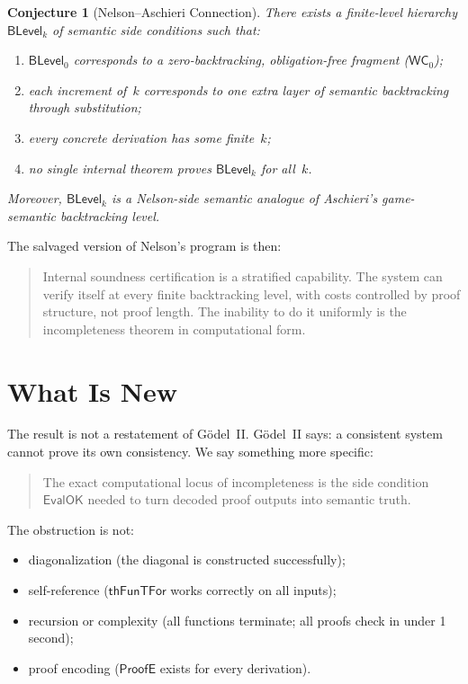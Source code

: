\documentclass[11pt]{article}
\newtheorem{conjecture}[theorem]{Conjecture}
\newcommand{\WCz}{\mathsf{WC}_0}
\newcommand{\EvalOK}{\mathsf{EvalOK}}
\newcommand{\ProofE}{\mathsf{ProofE}}
\newcommand{\thFunTFor}{\mathsf{thFunTFor}}
\newcommand{\BLevel}{\mathsf{BLevel}}
\begin{document}
\begin{conjecture}[Nelson--Aschieri Connection]
There exists a finite-level hierarchy $\BLevel_k$ of semantic side
conditions such that:
\begin{enumerate}
\item $\BLevel_0$ corresponds to a zero-backtracking, obligation-free
  fragment ($\WCz$);
\item each increment of~$k$ corresponds to one extra layer of semantic
  backtracking through substitution;
\item every concrete derivation has some finite~$k$;
\item no single internal theorem proves $\BLevel_k$ for all~$k$.
\end{enumerate}
Moreover, $\BLevel_k$ is a Nelson-side semantic analogue of Aschieri's
game-semantic backtracking level.
\end{conjecture}

The salvaged version of Nelson's program is then:

\begin{quote}
Internal soundness certification is a stratified capability.
The system can verify itself at every finite backtracking level,
with costs controlled by proof structure, not proof length.
The inability to do it uniformly is the incompleteness theorem
in computational form.
\end{quote}

\section{What Is New}

The result is not a restatement of G\"odel~II.
G\"odel~II says: a consistent system cannot prove its own consistency.
We say something more specific:

\begin{quote}
The exact computational locus of incompleteness is the side condition
$\EvalOK$ needed to turn decoded proof outputs into semantic truth.
\end{quote}

The obstruction is not:
\begin{itemize}
\item diagonalization (the diagonal is constructed successfully);
\item self-reference ($\thFunTFor$ works correctly on all inputs);
\item recursion or complexity (all functions terminate; all proofs
  check in under 1 second);
\item proof encoding ($\ProofE$ exists for every derivation).
\end{itemize}
\end{document}
